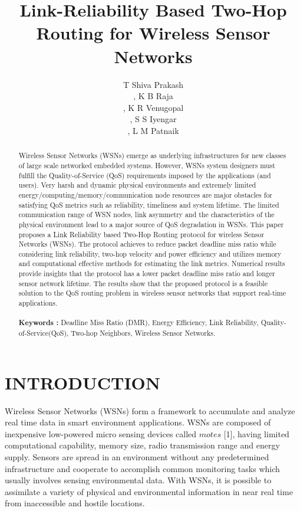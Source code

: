 \documentclass[fleqn,twoside]{article}
\title{\textbf{Link-Reliability Based Two-Hop Routing for Wireless Sensor Networks}}
\author{T Shiva Prakash\address[DCSE]{Department of Computer Science and Engineering, University Visvesvaraya College of\\ ~Engineering, Bangalore University, Bangalore 560 001 India, Contact: spt@ieee.org\\},
K B Raja\address[DECE]{Department of Electronics and Communication Engineering, University Visvesvaraya College of \\~Engineering, Bangalore University, Bangalore 560 001 India.\\},
K R Venugopal\address[DCSE]{Department of Computer Science and Engineering, University Visvesvaraya College of \\ ~Engineering, Bangalore University, Bangalore 560 001 India.\\},
S S Iyengar\address[DCSE]{Department of Computer Science, Louisiana State University, Baton Rouge, LA 70803, USA.\\},
L M Patnaik\address{Honorary Professor, Indian Institute of Science, Bangalore 560 012, India}}
\begin{document}
\begin{abstract}

Wireless Sensor Networks (WSNs) emerge as underlying infrastructures for new classes of large scale networked embedded systems. 
However, WSNs system designers must fulfill the Quality-of-Service (QoS) requirements imposed by the applications (and users). 
Very harsh and dynamic physical environments and extremely limited energy/computing/memory/communication node resources 
are major obstacles for satisfying QoS metrics such as reliability, timeliness and system lifetime. The limited communication 
range of WSN nodes, link asymmetry and the characteristics of the physical environment lead to a major source of QoS degradation 
in WSNs. This paper proposes a Link Reliability based Two-Hop Routing protocol for wireless Sensor Networks (WSNs). The protocol achieves to reduce packet deadline miss ratio while considering link reliability, two-hop velocity and power efficiency and utilizes memory and computational effective methods for estimating the link metrics. Numerical results provide insights that the protocol has a lower packet deadline miss ratio and longer sensor network lifetime. The results show that the proposed protocol is a feasible solution to the QoS routing problem in wireless sensor networks that support real-time applications. \\\\
{\bf Keywords :} Deadline Miss Ratio (DMR), Energy Efficiency, Link Reliability, Quality-of-Service(QoS), Two-hop Neighbors, Wireless Sensor Networks.
\end{abstract}

\maketitle


\section{INTRODUCTION}
\label{section:Introduction}
Wireless Sensor Networks (WSNs) form a framework to accumulate and analyze real time data in smart environment applications. WSNs are composed of inexpensive low-powered micro sensing devices called $motes$ [1], having limited computational capability, memory size, radio transmission range and energy supply. Sensors are spread in an environment without any predetermined infrastructure and cooperate to accomplish common monitoring tasks which usually involves sensing environmental data. With WSNs, it is possible to assimilate a variety of physical and environmental information in near real time from inaccessible and hostile locations. 
\end{document}
